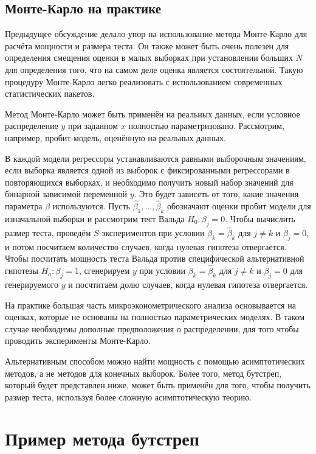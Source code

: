 \subsection{Монте-Карло на практике}

Предыдущее обсуждение делало упор на использование метода Монте-Карло для расчёта мощности и размера теста. Он также может быть очень полезен для определения смещения оценки в малых выборках при установлении больших $N$ для определения того, что на самом деле оценка является состоятельной. Такую процедуру Монте-Карло легко реализовать с использованием современных статистических пакетов.

Метод Монте-Карло может быть применён на реальных данных, если условное распределение $y$ при заданном $x$ полностью параметризовано. Рассмотрим, например, пробит-модель, оценённую на реальных данных. 

В каждой модели регрессоры устанавливаются равными выборочным значениям, если выборка является одной из выборок с фиксированными регрессорами в повторяющихся выборках, и необходимо получить новый набор значений для бинарной зависимой переменной $y$. Это будет зависеть от того, какие значения параметра $\beta$ используются. Пусть $\hat{\beta}_1, \dots, \hat{\beta}_k$ обозначают оценки пробит модели для изначальной выборки и рассмотрим тест Вальда $H_0: \beta_j = 0$. Чтобы вычислить размер теста, проведём $S$ экспериментов при условии $\beta_k = \hat{\beta}_k$ для $j \not= k$ и $\beta_j = 0$, и потом посчитаем количество случаев, когда нулевая гипотеза отвергается. Чтобы посчитать мощность теста Вальда против специфической альтернативной гипотезы $H_a: \beta_j = 1$, сгенерируем $y$ при условии $\beta_k = \hat{\beta}_k$ для $j \not= k$ и $\beta_j = 0$ для генерируемого $y$ и посчтитаем долю случаев, когда нулевая гипотеза отвергается.

На практике большая часть микроэконометрического анализа основывается на оценках, которые не основаны на полностью параметрических моделях. В таком случае необходимы дополные предположения о распределении, для того чтобы проводить эксперименты Монте-Карло. 

Альтернативным способом можно найти мощность с помощью асимптотических методов, а не методов для конечных выборок. Более того, метод бутстреп, который будет представлен ниже, может быть применён для того, чтобы получить размер теста, используя более сложную асимптотическую теорию. 

\section{Пример метода бутстреп}

